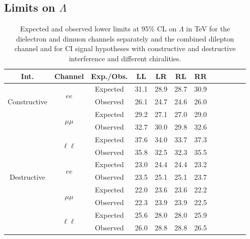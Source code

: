 \subsection{Limits on $\Lambda$}
\label{sec:limLambda}

\begin{table}[h!]
\begin{center}
\caption{Expected and observed lower limits at 95$\%$ CL on $\Lambda$ in TeV for the dielectron and dimuon channels separately and the combined dilepton channel and for CI signal hypotheses with constructive and destructive interference and different chiralities.}
{\begin{tabular}{c c c c c c c c c c c c}\toprule
Int. & Channel & Exp./Obs. & LL & LR & RL & RR \\
\midrule
\multirow{3}{*}[-1.5em]{\begin{sideways}Constructive\end{sideways}} & \multirow{2}{*}{$ee$} & Expected & 31.1 & 28.9 & 28.7 & 30.9 \\
& & Observed & 26.1 & 24.7 & 24.6 & 26.0 \\
\cmidrule{2-7}
 & \multirow{2}{*}{$\mu\mu$} & Expected & 29.2 & 27.1 & 27.0 & 29.0 \\
& & Observed & 32.7 & 30.0 & 29.8 & 32.6 \\
\cmidrule{2-7}
 & \multirow{2}{*}{$\ell\ell$} & Expected & 37.6 & 34.0 & 33.7 & 37.3 \\
& & Observed & 35.8 & 32.5 & 32.3 & 35.5 \\
\midrule
\multirow{3}{*}[-1.5em]{\begin{sideways}Destructive\end{sideways}} & \multirow{2}{*}{$ee$} & Expected & 23.0 & 24.4 & 24.4 & 23.2 \\
& & Observed & 23.5 & 25.1 & 25.1 & 23.7 \\
\cmidrule{2-7}
 & \multirow{2}{*}{$\mu\mu$} & Expected & 22.0 & 23.6 & 23.6 & 22.2 \\
& & Observed & 22.3 & 23.9 & 23.9 & 22.5 \\
\cmidrule{2-7}
 & \multirow{2}{*}{$\ell\ell$} & Expected & 25.6 & 28.0 & 28.0 & 25.9 \\
& & Observed & 26.0 & 28.8 & 28.8 & 26.5 \\
\bottomrule\end{tabular}}
\label{tab:lambdaLimits1}
\end{center}
\end{table}

